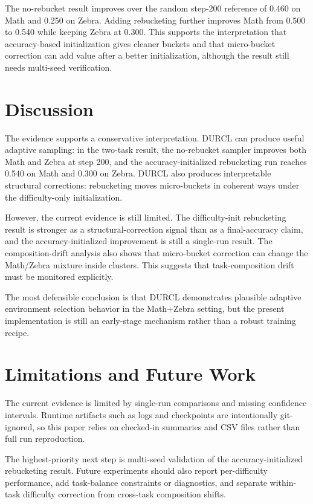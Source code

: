 \documentclass[10pt]{article}
\begin{document}
The no-rebucket result improves over the random step-200 reference of 0.460 on Math and 0.250 on Zebra. Adding rebucketing further improves Math from 0.500 to 0.540 while keeping Zebra at 0.300. This supports the interpretation that accuracy-based initialization gives cleaner buckets and that micro-bucket correction can add value after a better initialization, although the result still needs multi-seed verification.

\section{Discussion}

The evidence supports a conservative interpretation. DURCL can produce useful adaptive sampling: in the two-task result, the no-rebucket sampler improves both Math and Zebra at step 200, and the accuracy-initialized rebucketing run reaches 0.540 on Math and 0.300 on Zebra. DURCL also produces interpretable structural corrections: rebucketing moves micro-buckets in coherent ways under the difficulty-only initialization.

However, the current evidence is still limited. The difficulty-init rebucketing result is stronger as a structural-correction signal than as a final-accuracy claim, and the accuracy-initialized improvement is still a single-run result. The composition-drift analysis also shows that micro-bucket correction can change the Math/Zebra mixture inside clusters. This suggests that task-composition drift must be monitored explicitly.

The most defensible conclusion is that DURCL demonstrates plausible adaptive environment selection behavior in the Math+Zebra setting, but the present implementation is still an early-stage mechanism rather than a robust training recipe.

\section{Limitations and Future Work}

The current evidence is limited by single-run comparisons and missing confidence intervals. Runtime artifacts such as logs and checkpoints are intentionally git-ignored, so this paper relies on checked-in summaries and CSV files rather than full run reproduction.

The highest-priority next step is multi-seed validation of the accuracy-initialized rebucketing result. Future experiments should also report per-difficulty performance, add task-balance constraints or diagnostics, and separate within-task difficulty correction from cross-task composition shifts.
\end{document}
